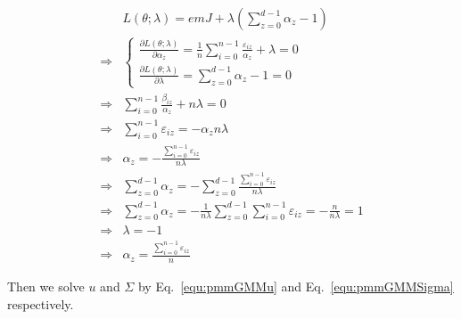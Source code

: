 \documentclass[runningheads,openany]{xhlPaper}
\begin{document}
\begin{equation}
\label{equ:pmmGMMAlpha}
\begin{aligned}
&L\left( {\theta ;\lambda } \right) = emJ + \lambda \left( {\sum\limits_{z = 0}^{d - 1} {{\alpha _z}}  - 1} \right)\\
\Rightarrow&\left\{ {\begin{array}{*{20}{c}}
{\frac{{\partial L\left( {\theta ;\lambda } \right)}}{{\partial {\alpha _z}}} = \frac{1}{n}\sum\limits_{i = 0}^{n - 1} {\frac{{{\varepsilon _{iz}}}}{{{\alpha _z}}}}  + \lambda  = 0}\\
{\frac{{\partial L\left( {\theta ;\lambda } \right)}}{{\partial \lambda }} = \sum\limits_{z = 0}^{d - 1} {{\alpha _z}}  - 1 = 0}
\end{array}} \right.\\
 \Rightarrow& \sum\limits_{i = 0}^{n - 1} {\frac{{{\beta _{iz}}}}{{{\alpha _z}}}}  + n\lambda  = 0\\
 \Rightarrow& \sum\limits_{i = 0}^{n - 1} {{\varepsilon _{iz}}}  =  - {\alpha _z}n\lambda \\
 \Rightarrow& {\alpha _z} =  - \frac{{\sum\limits_{i = 0}^{n - 1} {{\varepsilon _{iz}}} }}{{n\lambda }}\\
 \Rightarrow& \sum\limits_{z = 0}^{d - 1} {{\alpha _z}}  =  - \sum\limits_{z = 0}^{d - 1} {\frac{{\sum\limits_{i = 0}^{n - 1} {{\varepsilon _{iz}}} }}{{n\lambda }}} \\
 \Rightarrow& \sum\limits_{z = 0}^{d - 1} {{\alpha _z}}  =  - \frac{1}{{n\lambda }}\sum\limits_{z = 0}^{d - 1} {\sum\limits_{i = 0}^{n - 1} {{\varepsilon _{iz}}} }  =  - \frac{n}{{n\lambda }} = 1\\
 \Rightarrow& \lambda  =  - 1\\
 \Rightarrow& {\alpha _z} = \frac{{\sum\limits_{i = 0}^{n - 1} {{\varepsilon _{iz}}} }}{n}
\end{aligned}
\end{equation}

Then we solve $u$ and $\Sigma$ by Eq.~\ref{equ:pmmGMMu} and Eq.~\ref{equ:pmmGMMSigma} respectively.
\end{document}
